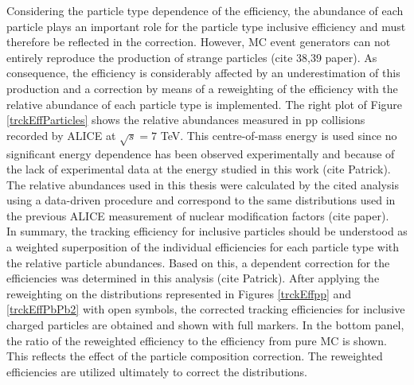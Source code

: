 \documentclass[12pt,a4paper]{report}
\begin{document}
Considering the particle type dependence of the efficiency, the abundance of each particle plays an important role for the particle type inclusive efficiency and must therefore be reflected in the correction. However, MC event generators can not entirely reproduce the production of strange particles (cite 38,39 paper). As consequence, the efficiency is considerably affected by an underestimation of this production and a correction by means of a reweighting of the efficiency with the relative abundance of each particle type is implemented. The right plot of Figure \ref{trckEffParticles} shows the relative abundances measured in pp collisions recorded by ALICE at $\sqrt{s} = 7$ TeV. This centre-of-mass energy is used since no significant energy dependence has been observed experimentally and because of the lack of experimental data at the energy studied in this work (cite Patrick). The relative abundances used in this thesis were calculated by the cited analysis using a data-driven procedure and correspond to the same distributions used in the previous ALICE measurement of nuclear modification factors (cite paper).\\
In summary, the tracking efficiency for inclusive particles should be understood as a weighted superposition of the individual efficiencies for each particle type with the relative particle abundances. Based on this, a \pt dependent correction for the efficiencies was determined in this analysis (cite Patrick). After applying the reweighting on the distributions represented in Figures \ref{trckEffpp} and \ref{trckEffPbPb2} with open symbols, the corrected tracking efficiencies for inclusive charged particles are obtained and shown with full markers. In the bottom panel, the ratio of the reweighted efficiency to the efficiency from pure MC is shown. This reflects the effect of the particle composition correction. The reweighted efficiencies are utilized ultimately to correct the \pt distributions. 
\end{document}
